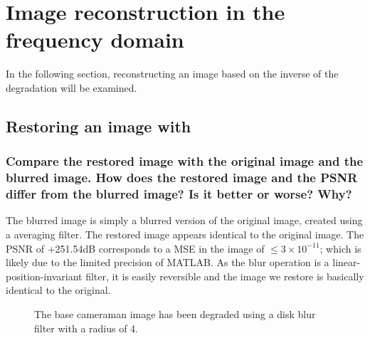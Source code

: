 \documentclass[article, 1.5space, letterpaper, 12pt, oneside, header, footer]{SydeClass}
\begin{document}
\clearpage
\section{Image reconstruction in the frequency domain}

In the following section, reconstructing an image based on the inverse of the degradation will be examined.

\subsection{Restoring an image with }

\subsubsection{Compare the restored image with the original image and the blurred image. How does the restored image and the PSNR differ from the blurred image? Is it better or worse? Why?}
The blurred image is simply a blurred version of the original image, created using a averaging filter. The restored image appears identical to the original image. The PSNR of +251.54dB corresponds to a MSE in the image of $\leq 3\times{10}^{-11}$; which is likely due to the limited precision of MATLAB. As the blur operation is a linear-position-invariant filter, it is easily reversible and the image we restore is basically identical to the original.


\begin{figure}[ht]
\centering
	\caption{The base cameraman image has been degraded using a disk blur filter with a radius of 4.}
\end{figure}
\end{document}
